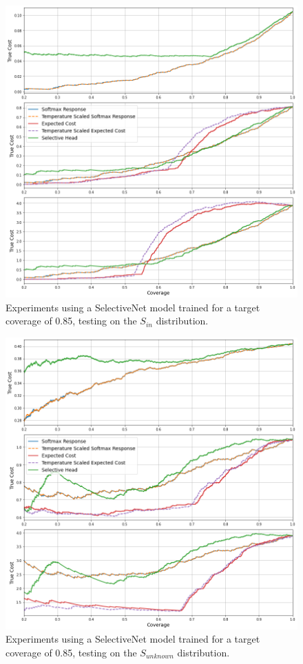\begin{figure}[H]
	\includegraphics[width=\textwidth]{images/binary/sn0.85_in_distribution.png}
	\caption*{Experiments using a SelectiveNet model trained for a target coverage of 0.85, testing on the $S_{in}$ distribution.}
\end{figure}

\begin{figure}[H]
	\includegraphics[width=\textwidth]{images/binary/sn0.85_out_distribution.png}
	\caption*{Experiments using a SelectiveNet model trained for a target coverage of 0.85, testing on the $S_{unknown}$ distribution.}
\end{figure}

